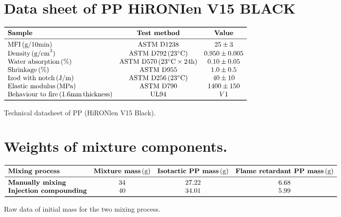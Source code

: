 \documentclass[a4paper, 11pt]{article}
\begin{document}
\begin{appendices}
\section{Data sheet of PP HiRONIen V15 BLACK}


\begin{table}[htp]
\centering
$
\begin{array}{lcc}
\toprule
\textbf{Sample} & \textbf{Test method} & \textbf{Value}\\
\midrule

\text{MFI}\,\text{(g/10min)} & \text{ASTM D}{1238} & 25 \pm 3 \\
\text{Density}\,\text{(g/cm}^3) & \text{ASTM D}{792}\, {(23^\circ\text{C})} & 0.950 \pm 0.005 \\
\text{Water absorption}\, (\%) & \text{ASTM D}{570}\, (23^\circ \text{C} \times 24\text{h}) & 0.10 \pm 0.05 \\
\text{Shrinkage}\, ({\%}) & \text{ASTM D}{955} & 1.0 \pm 0.5 \\
\text{Izod with notch}\, \text{(J/m)} & \text{ASTM D}{256}\,(23^\circ \text{C}) & 40 \pm 10 \\
\text{Elastic modulus}\, \text{(MPa)} & \text{ASTM D}{790}& 1400 \pm 150 \\
\text{Behaviour to fire}\, (1.6 \text{mm}\,\text{thickness)} & \text{UL}{94} & V1 \\
\bottomrule
\end{array}
$
\caption{Technical datasheet of PP (HiRONlen V15 Black).}
\label{tab:flame}
\end{table}

\section{Weights of mixture components.}

\begin{table}[htp]
\centering
$
\begin{array}{lccc}
\toprule
\textbf{Mixing process}& \textbf{Mixture mass}\,  \text{(g)} & \textbf{Isotactic PP mass}\,  \text{(g)} & \textbf{Flame retardant PP mass}\,  \text{(g)} \\
\midrule
\textbf{Manually mixing} & 34 & 27.22 & 6.68 \\
\textbf{Injection compounding} & 40 & 34.01 & 5.99 \\
\bottomrule
\end{array}
$
\caption{Raw data of initial mass for the two mixing process.}
\end{table}


\end{appendices}
\end{document}
